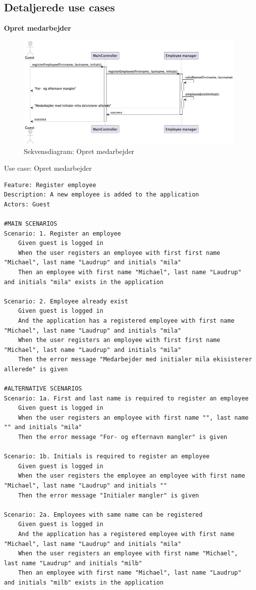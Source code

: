 \subsection{Detaljerede use cases}
\textbf{Opret medarbejder}
\begin{figure}[H]
    \centering
    \caption{Sekvensdiagram: Opret medarbejder}\label{fig:sequence_register_employee}
    \includegraphics[width = .75\textwidth]{Diagrams/seq_register_employee.png}
\end{figure}
\begin{listing}[H]
    \centering
    \caption{Use case: Opret medarbejder}\label{lst:usecase_register_employee}
    \begin{verbatim}  
Feature: Register employee
Description: A new employee is added to the application
Actors: Guest

#MAIN SCENARIOS
Scenario: 1. Register an employee
    Given guest is logged in
    When the user registers an employee with first first name "Michael", last name "Laudrup" and initials "mila"
    Then an employee with first name "Michael", last name "Laudrup" and initials "mila" exists in the application

Scenario: 2. Employee already exist
    Given guest is logged in
    And the application has a registered employee with first name "Michael", last name "Laudrup" and initials "mila"
    When the user registers an employee with first first name "Michael", last name "Laudrup" and initials "mila"
    Then the error message "Medarbejder med initialer mila ekisisterer allerede" is given

#ALTERNATIVE SCENARIOS
Scenario: 1a. First and last name is required to register an employee
    Given guest is logged in
    When the user registers an employee with first name "", last name "" and initials "mila"
    Then the error message "For- og efternavn mangler" is given

Scenario: 1b. Initials is required to register an employee
    Given guest is logged in
    When the user registers the employee an employee with first name "Michael", last name "Laudrup" and initials ""
    Then the error message "Initialer mangler" is given

Scenario: 2a. Employees with same name can be registered
    Given guest is logged in
    And the application has a registered employee with first name "Michael", last name "Laudrup" and initials "mila"
    When the user registers an employee with first name "Michael", last name "Laudrup" and initials "milb"
    Then an employee with first name "Michael", last name "Laudrup" and initials "milb" exists in the application
    \end{verbatim}
\end{listing}
